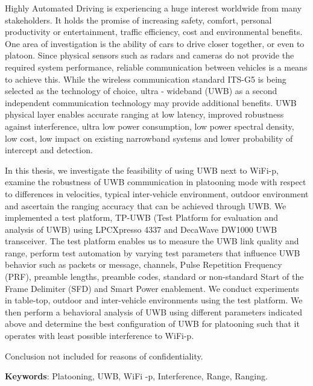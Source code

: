Highly Automated Driving is experiencing a huge interest worldwide from many stakeholders. It holds the promise of increasing safety, comfort, personal productivity or entertainment, traffic efficiency, cost and environmental benefits. One area of investigation is the ability of cars to drive closer together, or even to platoon. Since physical sensors such as radars and cameras do not provide the required system performance, reliable communication between vehicles is a means to achieve this. While the wireless communication standard ITS-G5 is being selected as the technology of choice, ultra - wideband (UWB) as a second independent communication technology may provide additional benefits. UWB physical layer enables accurate ranging at low latency, improved robustness against interference, ultra low power consumption, low power spectral density, low cost, low impact on existing narrowband systems and lower probability of intercept and detection.

In this thesis, we investigate the feasibility of using UWB next to WiFi-p, examine the robustness of UWB communication in platooning mode with respect to differences in velocities, typical inter-vehicle environment, outdoor environment and ascertain the ranging accuracy that can be achieved through UWB. We implemented a test platform, TP-UWB (Test Platform for evaluation and analysis of UWB) using LPCXpresso 4337 and DecaWave DW1000 UWB transceiver. The test platform enables us to measure the UWB link quality and range, perform test automation by varying test parameters that influence UWB behavior such as packets or message, channels, Pulse Repetition Frequency (PRF), preamble lengths, preamble codes, standard or non-standard Start of the Frame Delimiter (SFD) and Smart Power enablement. We conduct experiments in table-top, outdoor and inter-vehicle environments using the test platform. We then perform a behavioral analysis of UWB using different parameters indicated above and determine the best configuration of UWB for platooning such that it operates with least possible interference to WiFi-p.

Conclusion not included for reasons of confidentiality.

\textbf{Keywords}: Platooning, UWB, WiFi -p, Interference, Range, Ranging.  